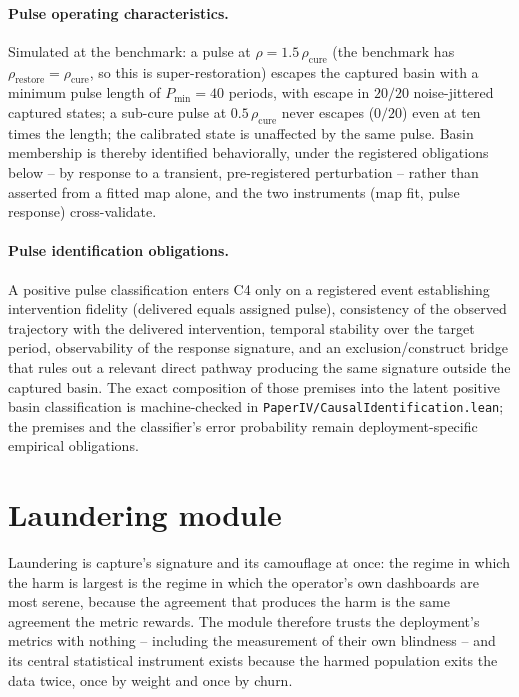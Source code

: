 \documentclass[11pt]{article}
\theoremstyle{definition}
\theoremstyle{remark}
\numberwithin{equation}{section}
\begin{document}
\paragraph{Pulse operating characteristics.} Simulated at the benchmark: a pulse at $\rho = 1.5\,\rho_{\mathrm{cure}}$ (the benchmark has $\rho_{\mathrm{restore}} = \rho_{\mathrm{cure}}$, so this is super-restoration) escapes the captured basin with a minimum pulse length of $P_{\min} = 40$ periods, with escape in $20/20$ noise-jittered captured states; a sub-cure pulse at $0.5\,\rho_{\mathrm{cure}}$ never escapes ($0/20$) even at ten times the length; the calibrated state is unaffected by the same pulse. Basin membership is thereby identified behaviorally, under the registered obligations below -- by response to a transient, pre-registered perturbation -- rather than asserted from a fitted map alone, and the two instruments (map fit, pulse response) cross-validate.

\paragraph{Pulse identification obligations.} A positive pulse classification
enters C4 only on a registered event establishing intervention fidelity
(delivered equals assigned pulse), consistency of the observed trajectory with
the delivered intervention, temporal stability over the target period,
observability of the response signature, and an exclusion/construct bridge
that rules out a relevant direct pathway producing the same signature outside
the captured basin. The exact composition of those premises into the latent
positive basin classification is machine-checked in
\texttt{PaperIV/CausalIdentification.lean}; the premises and the classifier's
error probability remain deployment-specific empirical obligations.

\section{Laundering module}\label{sec:laundering}

Laundering is capture's signature and its camouflage at once: the regime in which the harm is largest is the regime in which the operator's own dashboards are most serene, because the agreement that produces the harm is the same agreement the metric rewards. The module therefore trusts the deployment's metrics with nothing -- including the measurement of their own blindness -- and its central statistical instrument exists because the harmed population exits the data twice, once by weight and once by churn.
\end{document}
